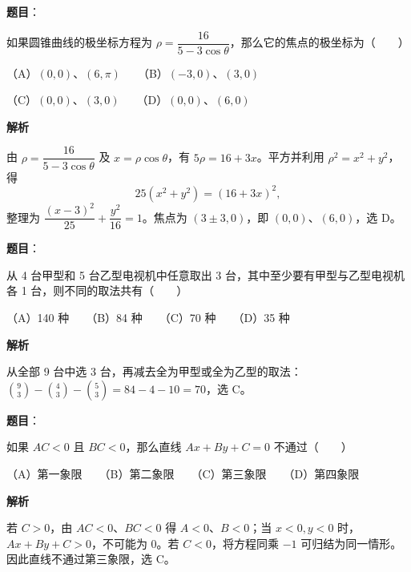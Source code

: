 \begin{answer}

\textbf{题目}：

如果圆锥曲线的极坐标方程为 $\rho=\dfrac{16}{5-3\cos\theta}$，那么它的焦点的极坐标为\mbox{（　　）}

（A）$(0,0)$、$(6,\pi)$　　（B）$(-3,0)$、$(3,0)$

（C）$(0,0)$、$(3,0)$　　（D）$(0,0)$、$(6,0)$

\textbf{解析}

由 $\rho=\dfrac{16}{5-3\cos\theta}$ 及 $x=\rho\cos\theta$，有 $5\rho=16+3x$。平方并利用 $\rho^2=x^2+y^2$，得
\nopagebreak[4]
\[
25(x^2+y^2)=(16+3x)^2,
\]
整理为 $\dfrac{(x-3)^2}{25}+\dfrac{y^2}{16}=1$。焦点为 $(3\pm3,0)$，即 $(0,0)$、$(6,0)$，选 D。


\end{answer}
\begin{answer}

\textbf{题目}：

从 4 台甲型和 5 台乙型电视机中任意取出 3 台，其中至少要有甲型与乙型电视机各 1 台，则不同的取法共有\mbox{（　　）}

（A）140 种　　（B）84 种　　（C）70 种　　（D）35 种

\textbf{解析}

从全部 9 台中选 3 台，再减去全为甲型或全为乙型的取法：$\binom93-\binom43-\binom53=84-4-10=70$，选 C。


\end{answer}
\begin{answer}

\textbf{题目}：

如果 $AC<0$ 且 $BC<0$，那么直线 $Ax+By+C=0$ 不通过\mbox{（　　）}

（A）第一象限　　（B）第二象限　　（C）第三象限　　（D）第四象限

\textbf{解析}

若 $C>0$，由 $AC<0$、$BC<0$ 得 $A<0$、$B<0$；当 $x<0,y<0$ 时，$Ax+By+C>0$，不可能为 0。若 $C<0$，将方程同乘 $-1$ 可归结为同一情形。因此直线不通过第三象限，选 C。


\end{answer}
